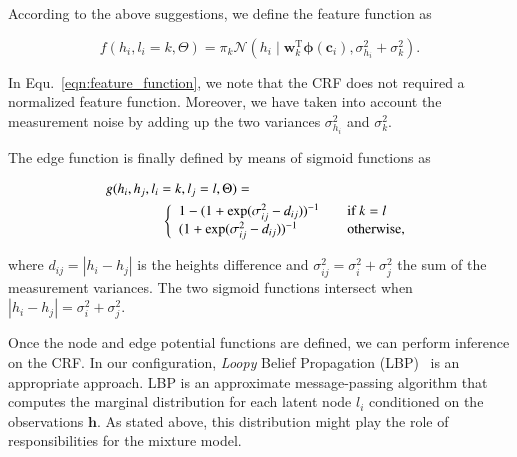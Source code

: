 According to the above suggestions, we define the feature function as

\begin{equation}
\label{eqn:feature_function}
f(h_i,l_i=k,\Theta)=\pi_k\mathcal{N}(h_i\mid\mathbf{w}_k^\text{T}
\boldsymbol{\phi}(\mathbf{c}_i), \sigma^2_{h_i} + \sigma^2_k).
\end{equation}

In Equ.~\eqref{eqn:feature_function}, we note that the CRF does not required a
normalized feature function. Moreover, we have taken into account the
measurement noise by adding up the two variances $\sigma^2_{h_i}$ and
$\sigma^2_{k}$.

The edge function is finally defined by means of sigmoid functions as

\begin{eqnarray}
\label{eqn:edge_function}
g(h_i,h_j,l_i=k,l_j=l,\Theta)=\phantom{aaaaaaaaaaaaaaaaaaaaaaa}\\ \nonumber
\left\{
\begin{array}{l l}
1-(1+\exp(\sigma^2_{ij}-d_{ij}))^{-1} & \quad
\text{if $k=l$}\\
(1+\exp(\sigma^2_{ij}-d_{ij}))^{-1} & \quad
\text{otherwise},
\end{array} \right.
\end{eqnarray}

where $d_{ij}=|h_i-h_j|$ is the heights difference and $\sigma^2_{ij}=\sigma^2_i
+\sigma^2_j$ the sum of the measurement variances. The two sigmoid functions
intersect when $|h_i-h_j|=\sigma^2_i+\sigma^2_j$.

Once the node and edge potential functions are defined, we can perform inference
on the CRF. In our configuration, \emph{Loopy} Belief
Propagation (LBP)~\cite{weiss00correctness} is an appropriate approach. LBP is
an approximate message-passing algorithm that computes the marginal distribution
for each latent node $l_i$ conditioned on the observations $\mathbf{h}$. As
stated above, this distribution might play the role of responsibilities for the
mixture model.
